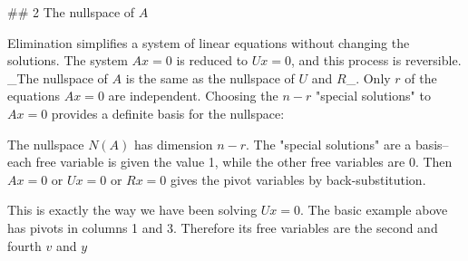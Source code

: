 ## 2 The nullspace of \(A\)

Elimination simplifies a system of linear equations without changing the solutions. The system \(Ax=0\) is reduced to \(Ux=0\), and this process is reversible. _The nullspace of \(A\) is the same as the nullspace of \(U\) and \(R\)_. Only \(r\) of the equations \(Ax=0\) are independent. Choosing the \(n-r\) "special solutions" to \(Ax=0\) provides a definite basis for the nullspace:

The nullspace \(N(A)\) has dimension \(n-r\). The "special solutions" are a basis--each free variable is given the value 1, while the other free variables are 0. Then \(Ax=0\) or \(Ux=0\) or \(Rx=0\) gives the pivot variables by back-substitution.

This is exactly the way we have been solving \(Ux=0\). The basic example above has pivots in columns 1 and 3. Therefore its free variables are the second and fourth \(v\) and \(y\) 